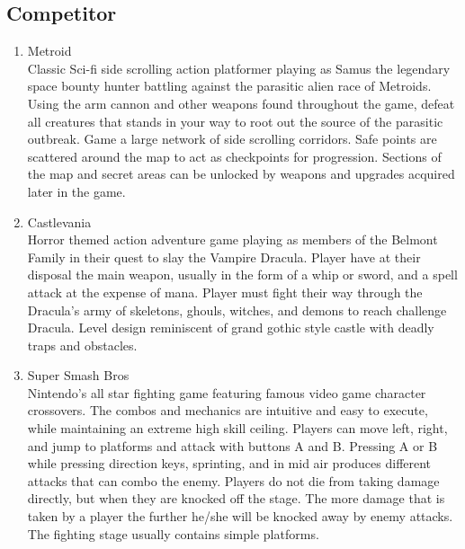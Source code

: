 \documentclass{article}
\begin{document}
\subsection*{Competitor}
    \begin{enumerate}
        \item Metroid \\
        Classic Sci-fi side scrolling action platformer playing as Samus the legendary space bounty hunter battling against the parasitic alien race of Metroids. Using the arm cannon and other weapons found throughout the game, defeat all creatures that stands in your way to root out the source of the parasitic outbreak. Game  a large network of side scrolling corridors. Safe points are scattered around the map to act as checkpoints for progression. Sections of the map and secret areas can be unlocked by weapons and upgrades acquired later in the game.
        \item Castlevania \\
        Horror themed action adventure game playing as members of the Belmont Family in their quest to slay the Vampire Dracula. Player have at their disposal the main weapon, usually in the form of a whip or sword, and a spell attack at the expense of mana. Player must fight their way through the Dracula’s army of skeletons, ghouls, witches, and demons to reach challenge Dracula. Level design reminiscent of grand gothic style castle with deadly traps and obstacles.
        \item Super Smash Bros \\
        Nintendo’s all star fighting game featuring famous video game character crossovers. The combos and mechanics are intuitive and easy to execute, while maintaining an extreme high skill ceiling. Players can move left, right, and jump to platforms and attack with buttons A and B. Pressing A or B while pressing direction keys, sprinting, and in mid air produces different attacks that can combo the enemy. Players do not die from taking damage directly, but when they are knocked off the stage. The more damage that is taken by a player the further he/she will be knocked away by enemy attacks. The fighting stage usually contains simple platforms. 

    \end{enumerate}
\end{document}
